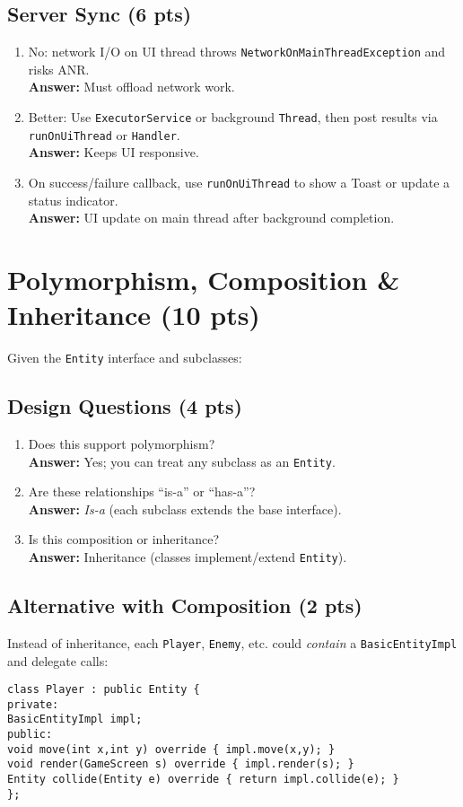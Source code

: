 \documentclass[12pt]{article}
\begin{document}
\subsection{Server Sync (6 pts)}
\begin{enumerate}[label=6.3.\arabic*.]
\item No: network I/O on UI thread throws \texttt{NetworkOnMainThreadException} and risks ANR.\\
\textbf{Answer:} Must offload network work.
\item Better: Use \texttt{ExecutorService} or background \texttt{Thread}, then post results via \texttt{runOnUiThread} or \texttt{Handler}.\\
\textbf{Answer:} Keeps UI responsive.
\item On success/failure callback, use \texttt{runOnUiThread} to show a Toast or update a status indicator.\\
\textbf{Answer:} UI update on main thread after background completion.
\end{enumerate}

\section{Polymorphism, Composition \& Inheritance (10 pts)}
Given the \texttt{Entity} interface and subclasses:
\subsection{Design Questions (4 pts)}
\begin{enumerate}[label=7.1.\arabic*.]
\item Does this support polymorphism?\\
\textbf{Answer:} Yes; you can treat any subclass as an \texttt{Entity}.
\item Are these relationships “is-a” or “has-a”?\\
\textbf{Answer:} \emph{Is-a} (each subclass extends the base interface).
\item Is this composition or inheritance?\\
\textbf{Answer:} Inheritance (classes implement/extend \texttt{Entity}).
\end{enumerate}

\subsection{Alternative with Composition (2 pts)}
Instead of inheritance, each \texttt{Player}, \texttt{Enemy}, etc. could \emph{contain} a \texttt{BasicEntityImpl} and delegate calls:
\begin{lstlisting}
class Player : public Entity {
private:
BasicEntityImpl impl;
public:
void move(int x,int y) override { impl.move(x,y); }
void render(GameScreen s) override { impl.render(s); }
Entity collide(Entity e) override { return impl.collide(e); }
};
\end{lstlisting}
\end{document}
